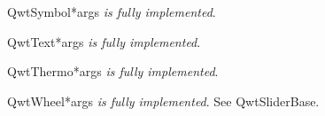 \documentclass{manual}
\begin{document}
\begin{classdesc}{QwtSymbol}{*args}
\emph{is fully implemented}.
\end{classdesc}

\begin{classdesc}{QwtText}{*args}
\emph{is fully implemented}.
\end{classdesc}

\begin{classdesc}{QwtThermo}{*args}
\emph{is fully implemented}.
\end{classdesc}

\begin{classdesc}{QwtWheel}{*args}
\emph{is fully implemented}. See QwtSliderBase.
\end{classdesc}

\renewcommand{\indexname}{Index}

\end{document}
